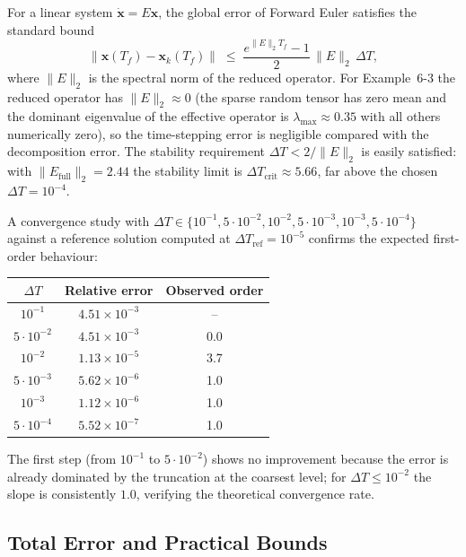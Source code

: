 \documentclass[11pt, oneside]{article}  %
\newcommand{\norm}[1]{\parallel\! #1\! \parallel}
\newcommand{\bx}{\textbf{x}}
\newcommand{\beq}{\begin{equation}}
\newcommand{\eeq}{\end{equation}}
\begin{document}
For a linear system $\dot{\bx}=E\bx$, the global error of Forward
Euler satisfies the standard bound
\beq\label{eq:fe-bound}
\norm{\bx(T_f)-\bx_k(T_f)}
\;\le\;
\frac{e^{\norm{E}_2 T_f}-1}{2}\,\norm{E}_2\,\Delta T,
\eeq
where $\norm{E}_2$ is the spectral norm of the reduced operator.
For Example~6-3 the reduced operator has $\norm{E}_2\approx 0$ (the
sparse random tensor has zero mean and the dominant eigenvalue of the
effective operator is $\lambda_{\max}\approx 0.35$ with all others
numerically zero), so the time-stepping error is negligible compared
with the decomposition error.  The stability requirement
$\Delta T < 2/\norm{E}_2$ is easily satisfied: with
$\norm{E_{\text{full}}}_2=2.44$ the stability limit is
$\Delta T_{\text{crit}}\approx 5.66$, far above the chosen
$\Delta T=10^{-4}$.

A convergence study with $\Delta T\in\{10^{-1},5\cdot10^{-2},10^{-2},
5\cdot10^{-3},10^{-3},5\cdot10^{-4}\}$ against a reference solution
computed at $\Delta T_{\text{ref}}=10^{-5}$ confirms the expected
first-order behaviour:
\begin{center}
\begin{tabular}{c|cc}
\hline
$\Delta T$ & Relative error & Observed order \\
\hline
$10^{-1}$ & $4.51\times 10^{-3}$ & -- \\
$5\cdot 10^{-2}$ & $4.51\times 10^{-3}$ & 0.0 \\
$10^{-2}$ & $1.13\times 10^{-5}$ & 3.7 \\
$5\cdot 10^{-3}$ & $5.62\times 10^{-6}$ & 1.0 \\
$10^{-3}$ & $1.12\times 10^{-6}$ & 1.0 \\
$5\cdot 10^{-4}$ & $5.52\times 10^{-7}$ & 1.0 \\
\hline
\end{tabular}
\end{center}
The first step (from $10^{-1}$ to $5\cdot10^{-2}$) shows no
improvement because the error is already dominated by the truncation
at the coarsest level; for $\Delta T\le 10^{-2}$ the slope is
consistently $1.0$, verifying the theoretical convergence rate.

\subsection{Total Error and Practical Bounds}
\label{sec7-3:total}
\end{document}
